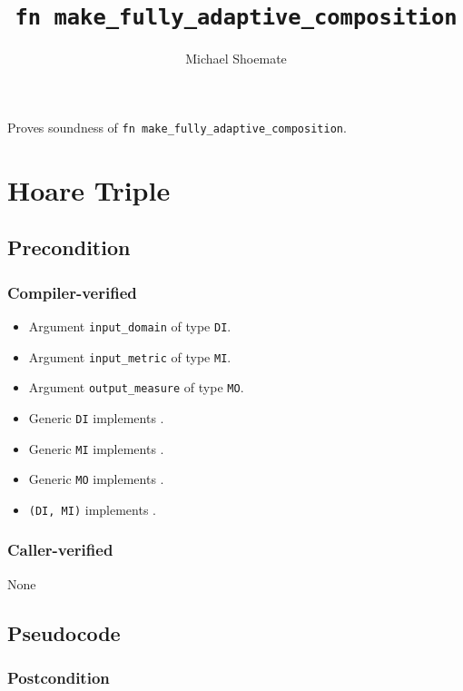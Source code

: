 \documentclass{article}
\title{\texttt{fn make\_fully\_adaptive\_composition}}
\author{Michael Shoemate}
\date{}
\begin{document}
\maketitle

\contrib
Proves soundness of \texttt{fn make\_fully\_adaptive\_composition}.

\section{Hoare Triple}
\subsection*{Precondition}
\subsubsection*{Compiler-verified}
\begin{itemize}
    \item Argument \texttt{input\_domain} of type \texttt{DI}.
    \item Argument \texttt{input\_metric} of type \texttt{MI}.
    \item Argument \texttt{output\_measure} of type \texttt{MO}.
    \item Generic \texttt{DI} implements .
    \item Generic \texttt{MI} implements .
    \item Generic \texttt{MO} implements .
    \item \texttt{(DI, MI)} implements .
\end{itemize}

\subsubsection*{Caller-verified}
None

\subsection*{Pseudocode}


\subsubsection*{Postcondition}
\begin{theorem}
\end{theorem}
\end{document}
